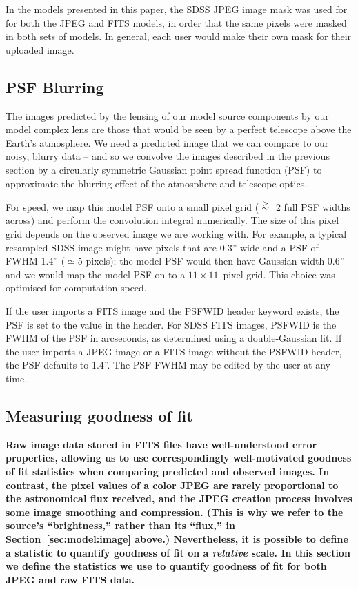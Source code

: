 \documentclass[iop]{emulateapj}
\def\gtsima{\; \buildrel > \over \sim \;}
\def\NEW#1{{\bf{#1}}}
\begin{document}
In the models presented in this paper, the SDSS JPEG image mask was used for
for both the JPEG and FITS models, in order that the same
pixels were masked in both sets of models. In general, each user would
make their own mask for their uploaded image.


\subsection{PSF Blurring}
\label{sec:psf}

The images predicted by the lensing of our model source components by our model
complex lens are those that would be seen by a perfect telescope above the
Earth's atmosphere. We need a predicted image that we can compare to our noisy,
blurry data -- and so we convolve the images described in the previous section
by a circularly symmetric Gaussian point spread function (PSF) to approximate
the blurring effect of the atmosphere and telescope optics.

For speed, we map this model PSF onto a small pixel grid ($\gtsima$ 2 full PSF 
widths across) and perform the convolution integral numerically.  The size of
this pixel grid depends on the observed image we are working with. For example,
a typical resampled  SDSS image might have pixels that are 0.3'' wide and a PSF
of FWHM 1.4''  ($\simeq 5$ pixels); the  model PSF would then have Gaussian
width 0.6'' and  we would map the model PSF on to a $11 \times 11$~pixel grid.
This choice was optimised for computation speed. 

If the user imports a FITS image and the PSFWID header keyword exists, the PSF
is set to the value in the header. For SDSS FITS images, PSFWID is the FWHM
of the PSF in arcseconds, as determined using a double-Gaussian fit. If the
user imports a JPEG image or a FITS image without the PSFWID header, the PSF
defaults to 1.4''. The PSF FWHM may be edited by the user at any time.



\subsection{Measuring goodness of fit}
\label{sec:chiSq}

\NEW{Raw image data stored in FITS files have well-understood error
properties, allowing us to use correspondingly well-motivated goodness of fit
statistics when comparing predicted and observed images. In contrast, the
pixel values of a color JPEG are rarely proportional to the astronomical flux
received, and the JPEG creation process involves some image smoothing and
compression. (This is why we refer to the source's ``brightness,'' rather than
its ``flux,'' in Section~\ref{sec:model:image} above.) Nevertheless, it is
possible to define a statistic to quantify goodness of fit on a  {\em
relative} scale. In this section we define the statistics we use to quantify
goodness of fit for both JPEG and raw FITS data.}
\end{document}
